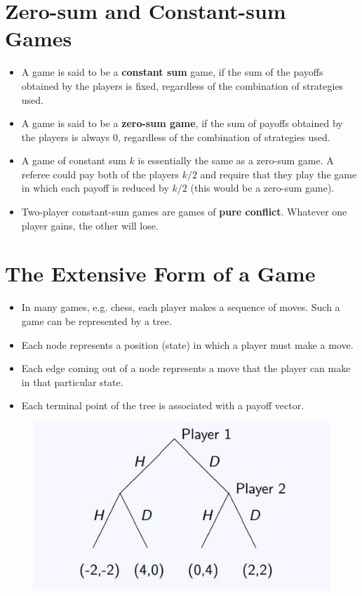 \documentclass[]{report}
\begin{document}
\section{Zero-sum and Constant-sum Games}
\begin{itemize}
	\item A game is said to be a \textbf{constant sum} game, if the sum of the
	payoffs obtained by the players is fixed, regardless of the
	combination of strategies used.
	\item A game is said to be a \textbf{zero-sum game}, if the sum of payoffs
	obtained by the players is always 0, regardless of the combination
	of strategies used.
	\item A game of constant sum $k$ is essentially the same as a zero-sum
	game. A referee could pay both of the players $k/2$ and require that
	they play the game in which each payoff is reduced by $k/2$ (this
	would be a zero-sum game).
	\item Two-player constant-sum games are games of \textbf{pure conflict}.
	Whatever one player gains, the other will lose.
\end{itemize}

\section{The Extensive Form of a Game}
\begin{itemize}
	\item In many games, e.g. chess, each player makes a sequence of moves.
	Such a game can be represented by a tree. 
		\item  Each node represents a
	position (state) in which a player must make a move.
	\item 	Each edge coming out of a node represents a move that the player
	can make in that particular state.
	\item 	Each terminal point of the tree is associated with a payoff vector.
\end{itemize}




\begin{figure}[h!]
\centering
\includegraphics[width=0.55\linewidth]{images/DR5-Slide09}
\caption{}
\label{fig:DR5-Slide09}
\end{figure}
\end{document}
